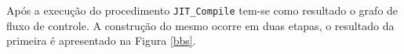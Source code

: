 Após a execução do procedimento
\verb!JIT_Compile! tem-se como resultado o grafo de fluxo de
controle. A construção do mesmo ocorre em duas etapas, o resultado da
primeira é apresentado na Figura \ref{bbs}.

